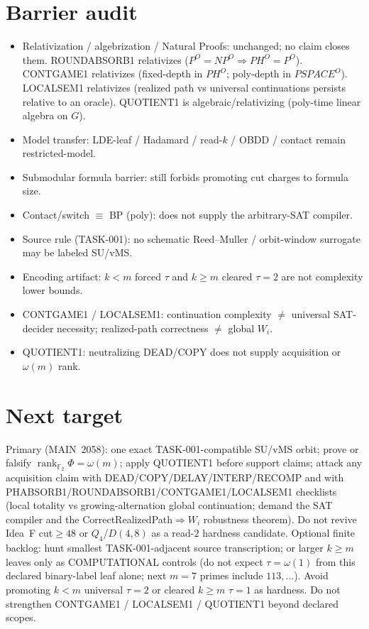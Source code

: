 \documentclass[11pt]{article}
\begin{document}
\section*{Barrier audit}
\begin{itemize}
\item Relativization / algebrization / Natural Proofs: unchanged; no claim closes them.
  ROUNDABSORB1 relativizes ($P^O{=}NP^O\Rightarrow PH^O{=}P^O$).
  CONTGAME1 relativizes (fixed-depth in $PH^O$; poly-depth in $PSPACE^O$).
  LOCALSEM1 relativizes (realized path vs universal continuations persists relative to an oracle).
  QUOTIENT1 is algebraic/relativizing (poly-time linear algebra on $G$).
\item Model transfer: LDE-leaf / Hadamard / read-$k$ / OBDD / contact remain restricted-model.
\item Submodular formula barrier: still forbids promoting cut charges to formula size.
\item Contact/switch $\equiv$ BP (poly): does not supply the arbitrary-SAT compiler.
\item Source rule (TASK-001): no schematic Reed--Muller / orbit-window surrogate may be labeled SU/vMS.
\item Encoding artifact: $k{<}m$ forced $\tau$ and $k{\ge}m$ cleared $\tau{=}2$ are not complexity lower bounds.
\item CONTGAME1 / LOCALSEM1: continuation complexity $\neq$ universal SAT-decider necessity;
  realized-path correctness $\neq$ global $W_i$.
\item QUOTIENT1: neutralizing DEAD/COPY does not supply acquisition or $\omega(m)$ rank.
\end{itemize}

\section*{Next target}
Primary (MAIN~2058): one exact TASK-001-compatible SU/vMS orbit; prove or falsify
$\operatorname{rank}_{\mathbb F_2}\Phi=\omega(m)$; apply QUOTIENT1 before support claims;
attack any acquisition claim with
DEAD/COPY/DELAY/INTERP/RECOMP and with PHABSORB1/ROUNDABSORB1/CONTGAME1/LOCALSEM1 checklists
(local totality vs growing-alternation global continuation; demand the SAT compiler and the
CorrectRealizedPath$\Rightarrow W_i$ robustness theorem).
Do not revive Idea~F cut$\ge48$ or $Q_4$/$D(4,8)$ as a read-$2$ hardness candidate.
Optional finite backlog: hunt smallest TASK-001-adjacent source transcription;
or larger $k{\ge}m$ leaves only as COMPUTATIONAL controls (do not expect $\tau=\omega(1)$
from this declared binary-label leaf alone; next $m{=}7$ primes include $113,\ldots$).
Avoid promoting $k{<}m$ universal $\tau{=}2$ or cleared $k{\ge}m$ $\tau{=}1$ as hardness.
Do not strengthen CONTGAME1 / LOCALSEM1 / QUOTIENT1 beyond declared scopes.
\end{document}
